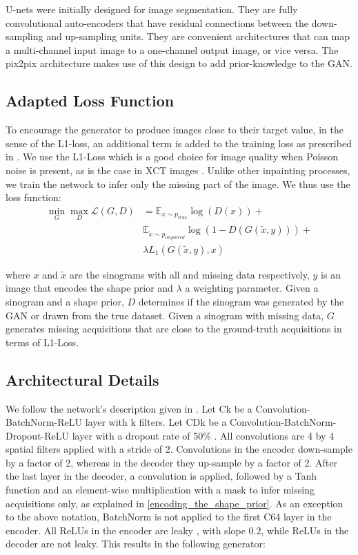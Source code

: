 \documentclass[../main.tex]{subfiles}
\begin{document}
U-nets were initially designed for image segmentation. They are fully convolutional auto-encoders that have residual connections between the down-sampling and up-sampling units. They are convenient architectures that can map a multi-channel input image to a one-channel output image, or vice versa. The pix2pix architecture makes use of this design to add prior-knowledge to the GAN. 

\subsection{Adapted Loss Function}

To encourage the generator to produce images close to their target value, in the sense of the L1-loss, an additional term is added to the training loss as prescribed in \cite{pathak2016context}. We use the L1-Loss  which is a good choice for image quality when Poisson noise is present, as is the case in XCT images \cite{dupe2011inverse}. Unlike other inpainting processes, we train the network to infer only the missing part of the image. We thus use the loss function:
\begin{align}
\min_G \max_D \mathcal{L}(\mathit{G}, \mathit{D}) &= \mathbb{E}_{x \sim p_{true}} \log(D(x)) +  \\
& \mathbb{E}_{\tilde{x} \sim p_{impaired}} \log(1-D(G( \tilde{x}, y ))) + \\
& \lambda L_1 (G( \tilde{x}, y ), x) 
\end{align}
 
where $x$ and $\tilde{x}$ are the  sinograms with all and missing data respectively, $y$ is an image that encodes the shape prior and $\lambda$ a weighting parameter. Given a sinogram and a shape prior, $\mathit{D}$ determines if the sinogram was generated by the GAN or drawn from the true dataset. Given a sinogram with missing data, $\mathit{G}$ generates missing acquisitions that are close to the ground-truth acquisitions in terms of L1-Loss\cite{larsen2016autoencoding}.

\subsection{Architectural Details}
We follow the network's description given in \cite{isola2017image}. Let Ck be a Convolution-BatchNorm-ReLU layer with k filters. Let CDk be a Convolution-BatchNorm-Dropout-ReLU layer with a dropout rate of 50\% \cite{srivastava2014dropout}. All convolutions are 4 by 4 spatial filters applied with a stride of 2. Convolutions in the encoder down-sample by a factor of 2, whereas in the decoder they up-sample by a factor of 2. After the last layer in the decoder, a convolution is applied, followed by a Tanh function and an element-wise multiplication with a mask to infer missing acquisitions only, as explained in \ref{encoding_the_shape_prior}. As an exception to the above notation, BatchNorm is not applied to the first C64 layer in the encoder. All ReLUs \cite{nair2010rectified} in the encoder are leaky \cite{maas2013rectifier}, with slope 0.2, while ReLUs in the decoder are not leaky. This results in the following generator:
\end{document}

